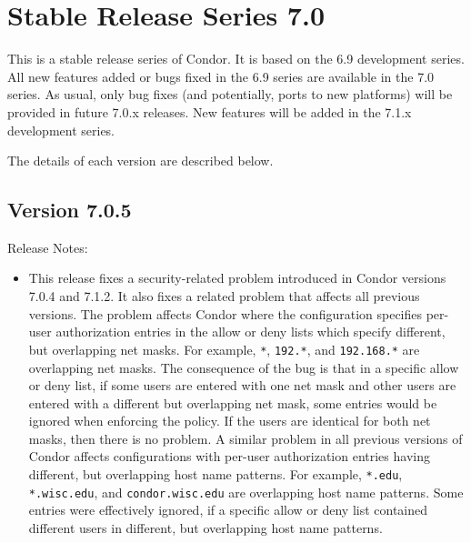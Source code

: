 
\section{\label{sec:History-7-0}Stable Release Series 7.0}

This is a stable release series of Condor.
It is based on the 6.9 development series.
All new features added or bugs fixed in the 6.9 series are available
in the 7.0 series.
As usual, only bug fixes (and potentially, ports to new platforms)
will be provided in future 7.0.x releases.
New features will be added in the 7.1.x development series.

The details of each version are described below.


\subsection*{\label{sec:New-7-0-5}Version 7.0.5}

\noindent Release Notes:

\begin{itemize}

\item \Security This release fixes a security-related problem
  introduced in Condor versions 7.0.4 and 7.1.2.  It also fixes a
  related problem that affects all previous versions.  The problem
  affects Condor where the configuration specifies per-user
  authorization entries in the allow or deny lists which specify
  different, but overlapping net masks.  
  For example, \verb|*|, \verb|192.*|, and \verb|192.168.*|
  are overlapping net masks.  
  The consequence of the bug is that in a specific allow or deny list, if
  some users are entered with one net mask and other users are entered
  with a different but overlapping net mask, some entries would be
  ignored when enforcing the policy.  If the users are identical for
  both net masks, then there is no problem.  A similar problem in all
  previous versions of Condor affects configurations with per-user
  authorization entries having different, but overlapping host name
  patterns.  For example, \verb|*.edu|, \verb|*.wisc.edu|, and
  \verb|condor.wisc.edu| are overlapping host name patterns.  Some
  entries were effectively ignored, if a specific allow or deny list
  contained different users in different, but overlapping host name
  patterns.

\end{itemize}

